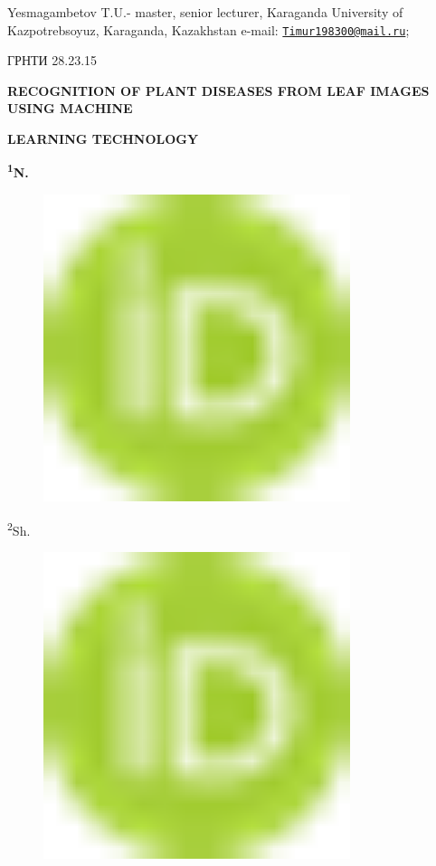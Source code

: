 Yesmagambetov T.U.- master, senior lecturer, Karaganda University of
Kazpotrebsoyuz, Karaganda, Kazakhstan e-mail:
\href{mailto:Timur198300@mail.ru}{\nolinkurl{Timur198300@mail.ru}};

ГРНТИ 28.23.15

{\bfseries RECOGNITION OF PLANT DISEASES FROM LEAF IMAGES USING MACHINE}

{\bfseries LEARNING TECHNOLOGY}

{\bfseries \textsuperscript{1}N.
\begin{figure}[H]
	\centering
	\includegraphics[width=0.8\textwidth]{media/ict/image1}
	\caption*{}
\end{figure}

\textsuperscript{2}Sh.
\begin{figure}[H]
	\centering
	\includegraphics[width=0.8\textwidth]{media/ict/image1}
	\caption*{}
\end{figure}

}
